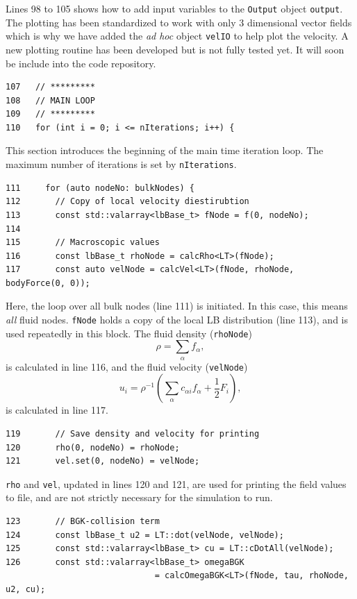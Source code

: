 \documentclass[11pt,a4paper]{report}
\begin{document}
Lines 98 to 105 shows how to add input variables to the \texttt{Output} object \texttt{output}. The plotting has been standardized to work with only 3 dimensional vector fields which is why we have added the \emph{ad hoc} object \texttt{velIO} to help plot the velocity. A new plotting routine has been developed but is not fully tested yet. It will soon be include into the code repository.
\begin{verbatim}
107   // *********
108   // MAIN LOOP
109   // *********
110   for (int i = 0; i <= nIterations; i++) {
\end{verbatim}
This section introduces the beginning of the main time iteration loop. The maximum number of iterations is set by \texttt{nIterations}. 
\begin{verbatim}
111     for (auto nodeNo: bulkNodes) {
112       // Copy of local velocity diestirubtion
113       const std::valarray<lbBase_t> fNode = f(0, nodeNo);
114
115       // Macroscopic values
116       const lbBase_t rhoNode = calcRho<LT>(fNode);
117       const auto velNode = calcVel<LT>(fNode, rhoNode, bodyForce(0, 0));
\end{verbatim}
Here, the loop over all bulk nodes (line 111) is initiated. In this case, this means \emph{all} fluid nodes. \texttt{fNode} holds a copy of the local LB distribution (line 113), and is used repeatedly in this block. The fluid density (\texttt{rhoNode})
\begin{equation*}
\rho = \sum_\alpha f_\alpha,
\end{equation*}   
is calculated in line 116, and the fluid velocity (\texttt{velNode})
\begin{equation*}
u_i = \rho^{-1}\left(\sum_\alpha c_{\alpha i}f_\alpha + \frac{1}{2}F_i\right),
\end{equation*}
is calculated in line 117.
\begin{verbatim}
119       // Save density and velocity for printing
120       rho(0, nodeNo) = rhoNode;
121       vel.set(0, nodeNo) = velNode;
\end{verbatim}
\texttt{rho} and \texttt{vel}, updated in lines 120 and 121, are used for printing the field values to file, and are not strictly necessary for the simulation to run. 
\begin{verbatim}
123       // BGK-collision term
124       const lbBase_t u2 = LT::dot(velNode, velNode);
125       const std::valarray<lbBase_t> cu = LT::cDotAll(velNode);
126       const std::valarray<lbBase_t> omegaBGK 
                              = calcOmegaBGK<LT>(fNode, tau, rhoNode, u2, cu);
\end{verbatim}
\end{document}
